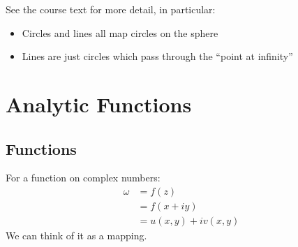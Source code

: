 \documentclass[12pt,titlepage]{article}
\let\stdsection\section
\renewcommand\section{\clearpage\stdsection}
\begin{document}
See the course text for more detail, in particular: \begin{itemize}
	\item Circles and lines all map circles on the sphere
	\item Lines are just circles which pass through the ``point at infinity''
\end{itemize}
\section{Analytic Functions}
\subsection{Functions}
For a function on complex numbers: \begin{align*}
	\omega &= f(z)\\
	&=f(x+iy) \\
	&=u(x,y) + iv(x,y)
\end{align*}
We can think of it as a mapping. 
\end{document}
